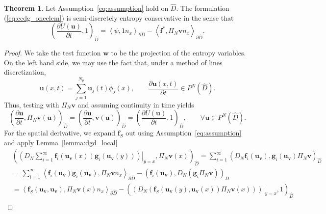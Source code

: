 \documentclass[preprint,10pt]{elsarticle}
\theoremstyle{definition}
\theoremstyle{lemma}
\theoremstyle{theorem}
\newtheorem{theorem}{Theorem}
\theoremstyle{assumption}
\newcommand{\pd}[2]{\frac{\partial#1}{\partial#2}}
\newcommand{\LRp}[1]{\left( #1 \right)}
\newcommand{\LRa}[1]{\left\langle #1 \right\rangle}
\begin{document}
\begin{theorem}
\label{lemma:ec1}
Let Assumption~\ref{eq:assumption} hold on $\widehat{D}$.  The formulation (\ref{eq:ecdg_oneelem})
 is semi-discretely entropy conservative in the sense that
\[
\LRp{\pd{U(\bm{u})}{t},1}_{\widehat{D}} =  \LRa{\psi,1{n}_x}_{\partial \widehat{D}}-\LRa{{\bm{f}^*, \Pi_N\bm{v}}{n}_x}_{\partial \widehat{D}}.
\]
\end{theorem}
\begin{proof}
We take the test function $\bm{w}$ to be the projection of the entropy variables.  On the left hand side, we may use the fact that, under a method of lines discretization, 
\[
\bm{u}(x,t) = \sum_{j=1}^{N_p} \bm{u}_j(t) \phi_j(x), \qquad \pd{\bm{u}(x,t)}{t} \in P^N\LRp{\widehat{D}}.
\]
Thus, testing with $\Pi_N \bm{v}$ and assuming continuity in time yields 
\[
\LRp{\pd{\bm{u}}{t}, \Pi_N \bm{v}(\bm{u})}_{\widehat{D}} = \LRp{\pd{\bm{u}}{t},\bm{v}(\bm{u})}_{\widehat{D}} = \LRp{\pd{U(\bm{u})}{t},1}_{\widehat{D}}, \qquad \forall \bm{u}\in P^N\LRp{\widehat{D}}.
\]
For the spatial derivative, we expand $\bm{f}_S$ out using Assumption~\ref{eq:assumption} and apply Lemma~\ref{lemma:dgd_local}
\begin{align*}
&\LRp{\left.\LRp{D_N \sum_{i=1}^{\infty}\bm{f}_i(\bm{u}_{\bm{v}}(x))\bm{g}_i(\bm{u}_{\bm{v}}(y))}\right|_{y=x}, \Pi_N\bm{v}(x)}_{\widehat{D}} = \sum_{i=1}^{\infty} \LRp{{D_N \bm{f}_i(\bm{u}_{\bm{v}})}, {\bm{g}_i(\bm{u}_{\bm{v}})\Pi_N\bm{v} }}_{\widehat{D}}\\
&= \sum_{i=1}^{\infty}\LRa{\bm{f}_i(\bm{u}_{\bm{v}}) \bm{g}_i(\bm{u}_{\bm{v}}),\Pi_N\bm{v}{n}_x}_{\partial \widehat{D}}  - \LRp{ \bm{f}_i(\bm{u}_{\bm{v}}), D_N \LRp{\bm{g}_i\Pi_N\bm{v} }}_{\widehat{D}}\\
&= \LRa{\bm{f}_S(\bm{u}_{\bm{v}},\bm{u}_{\bm{v}}), \Pi_N\bm{v}(x){n}_x}_{\partial \widehat{D}}  - \LRp{\left.\LRp{D_N \LRp{\bm{f}_S(\bm{u}_{\bm{v}}(y),\bm{u}_{\bm{v}}(x))\Pi_N\bm{v}(x)} }\right|_{y=x},1}_{\widehat{D}}\\

\end{align*}
\end{proof}
\end{document}
